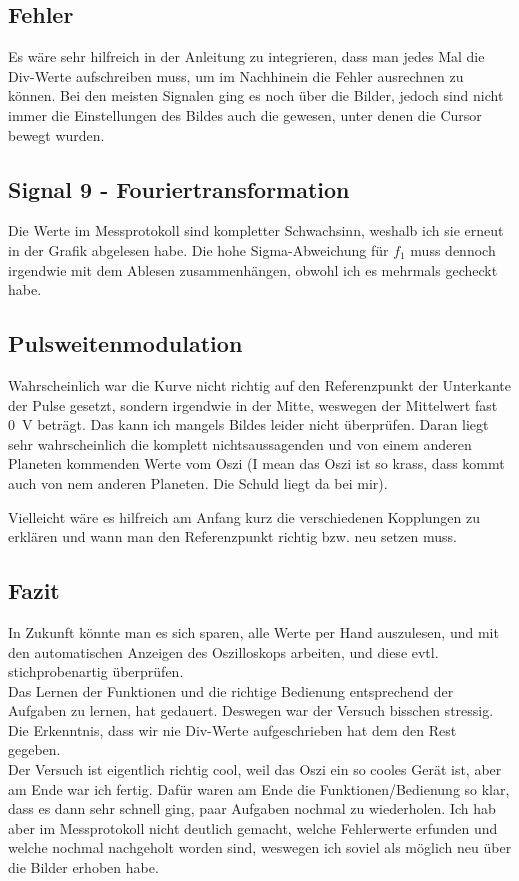 \subsection{Fehler}
Es wäre sehr hilfreich in der Anleitung zu integrieren, dass man jedes Mal die Div-Werte aufschreiben muss, um im Nachhinein die Fehler ausrechnen zu können. Bei den meisten Signalen ging es noch über die Bilder, jedoch sind nicht immer die Einstellungen des Bildes auch die gewesen, unter denen die Cursor bewegt wurden.

\subsection{Signal 9 - Fouriertransformation}
Die Werte im Messprotokoll sind kompletter Schwachsinn, weshalb ich sie erneut in der Grafik abgelesen habe. Die hohe Sigma-Abweichung für \(f_1\) muss dennoch irgendwie mit dem Ablesen zusammenhängen, obwohl ich es mehrmals gecheckt habe. 

\subsection{Pulsweitenmodulation}
Wahrscheinlich war die Kurve nicht richtig auf den Referenzpunkt der Unterkante der Pulse gesetzt, sondern irgendwie in der Mitte, weswegen der Mittelwert fast \qty{0}{\volt} beträgt. Das kann ich mangels Bildes leider nicht überprüfen. Daran liegt sehr wahrscheinlich die komplett nichtsaussagenden und von einem anderen Planeten kommenden Werte vom Oszi (I mean das Oszi ist so krass, dass kommt auch von nem anderen Planeten. Die Schuld liegt da bei mir). 

Vielleicht wäre es hilfreich am Anfang kurz die verschiedenen Kopplungen zu erklären und wann man den Referenzpunkt richtig bzw. neu setzen muss.

\subsection{Fazit}
In Zukunft könnte man es sich sparen, alle Werte per Hand auszulesen, und mit den automatischen Anzeigen des Oszilloskops arbeiten, und diese evtl. stichprobenartig überprüfen.\\
Das Lernen der Funktionen und die richtige Bedienung entsprechend der Aufgaben zu lernen, hat gedauert. Deswegen war der Versuch bisschen stressig. Die Erkenntnis, dass wir nie Div-Werte aufgeschrieben hat dem den Rest gegeben.\\
Der Versuch ist eigentlich richtig cool, weil das Oszi ein so cooles Gerät ist, aber am Ende war ich fertig. Dafür waren am Ende die Funktionen/Bedienung so klar, dass es dann sehr schnell ging, paar Aufgaben nochmal zu wiederholen. Ich hab aber im Messprotokoll nicht deutlich gemacht, welche Fehlerwerte erfunden und welche nochmal nachgeholt worden sind, weswegen ich soviel als möglich neu über die Bilder erhoben habe.
